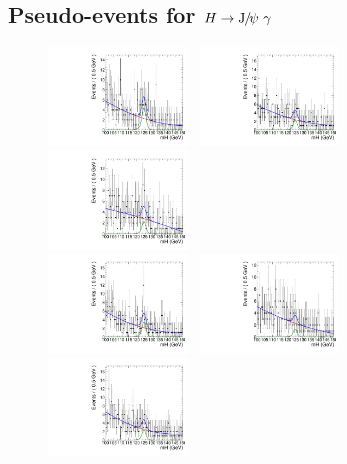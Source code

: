 \subsection{Pseudo-events for $H\to {\mathrm{J}\hspace{-.08em}/\hspace{-.14em}\psi}\ \gamma$}
\begin{figure}[!ht]
  \centering
  \includegraphics[width=0.33\textwidth]{Fig/BiasStudy/Toys/HJpsiG/TruePdf1_FitPdf1_mu300_sbfit_1232_cat1}~
  \includegraphics[width=0.33\textwidth]{Fig/BiasStudy/Toys/HJpsiG/TruePdf1_FitPdf1_mu300_sbfit_12345_cat1}~
  \includegraphics[width=0.33\textwidth]{Fig/BiasStudy/Toys/HJpsiG/TruePdf1_FitPdf1_mu300_sbfit_12321_cat1}\\
  \includegraphics[width=0.33\textwidth]{Fig/BiasStudy/Toys/HJpsiG/TruePdf1_FitPdf1_mu300_sbfit_12318_cat1}~
  \includegraphics[width=0.33\textwidth]{Fig/BiasStudy/Toys/HJpsiG/TruePdf1_FitPdf1_mu300_sbfit_12337_cat1}~
  \includegraphics[width=0.33\textwidth]{Fig/BiasStudy/Toys/HJpsiG/TruePdf1_FitPdf1_mu300_sbfit_12333_cat1}\\

\end{figure}
